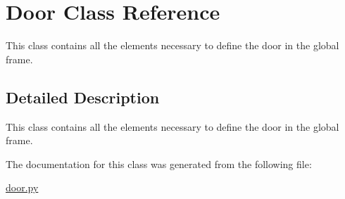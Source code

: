 \hypertarget{classDoor}{}\section{Door Class Reference}
\label{classDoor}


This class contains all the elements necessary to define the door in the global frame.  




\subsection{Detailed Description}
This class contains all the elements necessary to define the door in the global frame. 

 

The documentation for this class was generated from the following file\+:\begin{DoxyCompactItemize}
\item 
\hyperlink{door_8py}{door.\+py}\end{DoxyCompactItemize}
